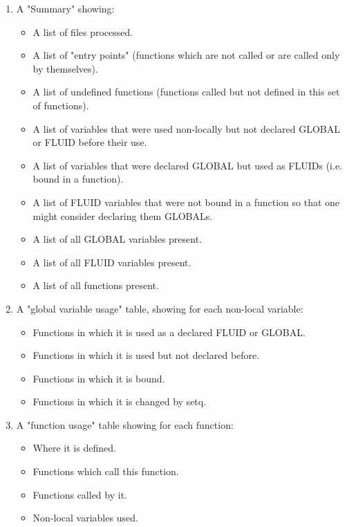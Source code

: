\begin{enumerate}
\item  A "Summary" showing:
\begin{itemize}

 \item       A list of files processed.


\item        A list of "entry points" (functions  which  are    not
          called or are called only by themselves).

\item A list of undefined  functions  (functions  called but
          not defined in this set of functions).

\item         A list of variables that were used non-locally but
not
          declared GLOBAL or FLUID before their use.

\item        A list of variables that were declared GLOBAL but used
          as FLUIDs (i.e. bound in a function).

 \item        A  list  of  FLUID  variables that were not bound in
a
          function so that one  might  consider  declaring  them
          GLOBALs.

 \item        A list of all GLOBAL variables present.

 \item        A list of all FLUID variables present.

\item         A list of all functions present.
\end{itemize}

\item     A "global variable usage" table, showing for each
non-local variable:
\begin{itemize}

\item          Functions in which it is used as a declared
										FLUID or GLOBAL.
  
\item         Functions in which it is used but not declared
          before.

\item          Functions in which it is bound.

\item         Functions in which it is changed by setq.
\end{itemize}
\item   A "function usage" table showing for each function:

\begin{itemize}
\item         Where it is defined.

\item        Functions which call this function.

\item         Functions called by it.

 \item        Non-local variables used.
\end{itemize}
\end{enumerate}
